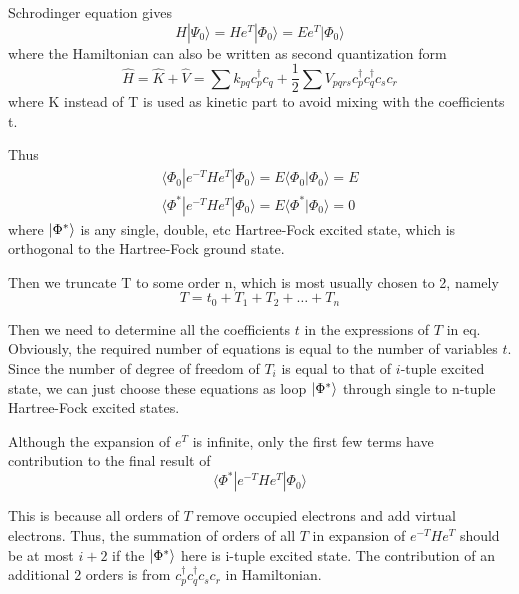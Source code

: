 Schrodinger equation gives
\begin{equation}
H | \Psi_{0} \rangle=H e^{T} | \Phi_{0} \rangle=E e^{T} | \Phi_{0} \rangle
\end{equation}
where the Hamiltonian can also be written as second quantization form
\begin{equation}
\hat{H}=\hat{K}+\hat{V}=\sum k_{p q} c_{p}^{\dagger} c_{q}+\frac{1}{2} \sum V_{p q r s} c_{p}^{\dagger} c_{q}^{\dagger} c_{s} c_{r}
\end{equation}
where K instead of T is used as kinetic part to avoid mixing with the coefficients t.

Thus
\begin{equation}
\begin{array}{l}
{\langle\Phi_{0}|e^{-T} H e^{T}| \Phi_{0}\rangle= E\langle\Phi_{0} | \Phi_{0}\rangle= E}
\\
{\langle\Phi^{*}|e^{-T} H e^{T}| \Phi_{0}\rangle= E\langle\Phi^{*} | \Phi_{0}\rangle= 0}
\end{array}
\end{equation}
where $\ket{\Phi^{*}}$ is any single, double, etc Hartree-Fock excited state, which is orthogonal to the Hartree-Fock ground state.

Then we truncate T to some order n, which is most usually chosen to 2, namely
\begin{equation}
T=t_0+T_1+T_2+ \dots +T_n
\end{equation}

Then we need to determine all the coefficients $t$ in the expressions of $T$ in eq.
Obviously, the required number of equations is equal to the number of variables $t$.
Since the number of degree of freedom of $T_i$ is equal to that of $i$-tuple excited state, we can just choose these equations as loop $\ket{\Phi^{*}}$ through single to n-tuple Hartree-Fock excited states.

Although the expansion of $e^T$ is infinite, only the first few terms have contribution to the final result of 
\begin{equation}
\langle\Phi^{*}|e^{-T} H e^{T}| \Phi_{0}\rangle
\end{equation}

This is because all orders of $T$ remove occupied electrons and add virtual electrons.
Thus, the summation of orders of all $T$ in expansion of $e^{-T} H e^{T}$ should be at most $i+2$ if the $\ket{\Phi^{*}}$ here is i-tuple excited state.
The contribution of an additional 2 orders is from $c_{p}^{\dagger} c_{q}^{\dagger} c_{s} c_{r}$ in Hamiltonian.

